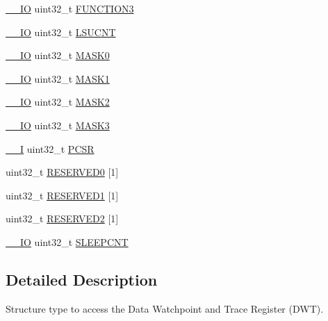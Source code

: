 \begin{DoxyCompactItemize}
\item 
\hyperlink{core__cm3_8h_aec43007d9998a0a0e01faede4133d6be}{\+\_\+\+\_\+\+IO} uint32\+\_\+t \hyperlink{structDWT__Type_a80bd242fc05ca80f9db681ce4d82e890}{F\+U\+N\+C\+T\+I\+O\+N3}
\item 
\hyperlink{core__cm3_8h_aec43007d9998a0a0e01faede4133d6be}{\+\_\+\+\_\+\+IO} uint32\+\_\+t \hyperlink{structDWT__Type_aeba92e6c7fd3de4ba06bfd94f47f5b35}{L\+S\+U\+C\+NT}
\item 
\hyperlink{core__cm3_8h_aec43007d9998a0a0e01faede4133d6be}{\+\_\+\+\_\+\+IO} uint32\+\_\+t \hyperlink{structDWT__Type_a5bb1c17fc754180cc197b874d3d8673f}{M\+A\+S\+K0}
\item 
\hyperlink{core__cm3_8h_aec43007d9998a0a0e01faede4133d6be}{\+\_\+\+\_\+\+IO} uint32\+\_\+t \hyperlink{structDWT__Type_a0c684438a24f8c927e6e01c0e0a605ef}{M\+A\+S\+K1}
\item 
\hyperlink{core__cm3_8h_aec43007d9998a0a0e01faede4133d6be}{\+\_\+\+\_\+\+IO} uint32\+\_\+t \hyperlink{structDWT__Type_a8ecdc8f0d917dac86b0373532a1c0e2e}{M\+A\+S\+K2}
\item 
\hyperlink{core__cm3_8h_aec43007d9998a0a0e01faede4133d6be}{\+\_\+\+\_\+\+IO} uint32\+\_\+t \hyperlink{structDWT__Type_ae3f01137a8d28c905ddefe7333547fba}{M\+A\+S\+K3}
\item 
\hyperlink{core__cm3_8h_af63697ed9952cc71e1225efe205f6cd3}{\+\_\+\+\_\+I} uint32\+\_\+t \hyperlink{structDWT__Type_abc5ae11d98da0ad5531a5e979a3c2ab5}{P\+C\+SR}
\item 
uint32\+\_\+t \hyperlink{structDWT__Type_addd893d655ed90d40705b20170daac59}{R\+E\+S\+E\+R\+V\+E\+D0} \mbox{[}1\mbox{]}
\item 
uint32\+\_\+t \hyperlink{structDWT__Type_a069871233a8c1df03521e6d7094f1de4}{R\+E\+S\+E\+R\+V\+E\+D1} \mbox{[}1\mbox{]}
\item 
uint32\+\_\+t \hyperlink{structDWT__Type_a8556ca1c32590517602d92fe0cd55738}{R\+E\+S\+E\+R\+V\+E\+D2} \mbox{[}1\mbox{]}
\item 
\hyperlink{core__cm3_8h_aec43007d9998a0a0e01faede4133d6be}{\+\_\+\+\_\+\+IO} uint32\+\_\+t \hyperlink{structDWT__Type_a8afd5a4bf994011748bc012fa442c74d}{S\+L\+E\+E\+P\+C\+NT}
\end{DoxyCompactItemize}


\subsection{Detailed Description}
Structure type to access the Data Watchpoint and Trace Register (D\+WT). 

